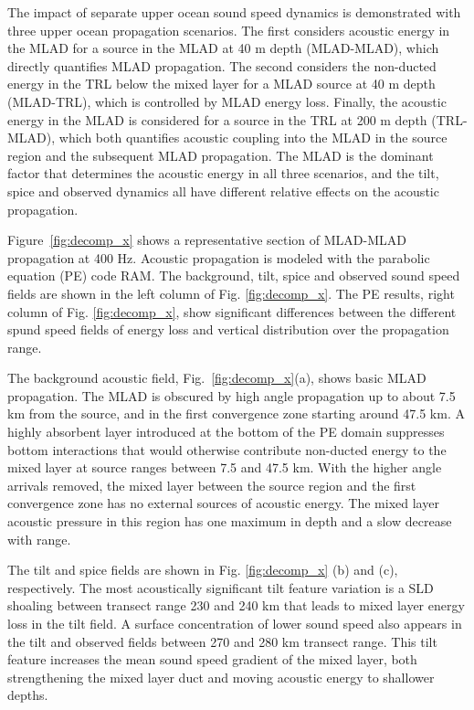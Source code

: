 \documentclass[preprint,NumberedRefs]{JASA}
\begin{document}
The impact of separate upper ocean sound speed dynamics is demonstrated with three upper ocean propagation scenarios. The first considers acoustic energy in the MLAD for a source in the MLAD at 40 m depth (MLAD-MLAD), which directly quantifies MLAD propagation. The second considers the non-ducted energy in the TRL below the mixed layer for a MLAD source at 40 m depth (MLAD-TRL), which is controlled by MLAD energy loss. Finally, the acoustic energy in the MLAD is considered for a source in the TRL at 200 m depth (TRL-MLAD), which both quantifies acoustic coupling into the MLAD in the source region and the subsequent MLAD propagation. The MLAD is the dominant factor that determines the acoustic energy in all three scenarios, and the tilt, spice and observed dynamics all have different relative effects on the acoustic propagation.

Figure~\ref{fig:decomp_x} shows a representative section of MLAD-MLAD propagation at 400 Hz. Acoustic propagation is modeled with the parabolic equation (PE) code RAM\citep{collins93}. The background, tilt, spice and observed sound speed fields are shown in the left column of Fig. \ref{fig:decomp_x}. The PE results, right column  of Fig. \ref{fig:decomp_x}, show significant differences between the different spund speed fields of energy loss and vertical distribution over the propagation range.

The background acoustic field, Fig.~\ref{fig:decomp_x}(a), shows basic MLAD propagation. The MLAD is obscured by high angle propagation up to about 7.5 km from the source, and in the first convergence zone starting around 47.5 km. A highly absorbent layer introduced at the bottom of the PE domain suppresses bottom interactions that would otherwise contribute non-ducted energy to the mixed layer at source ranges between 7.5 and 47.5 km. With the higher angle arrivals removed, the mixed layer between the source region and the first convergence zone has no external sources of acoustic energy. The mixed layer acoustic pressure in this region has one maximum in depth and a slow decrease with range.

The tilt and spice fields are shown in Fig. \ref{fig:decomp_x} (b) and (c), respectively. The most acoustically significant tilt feature variation is a SLD shoaling between transect range 230 and 240 km that leads to mixed layer energy loss in the tilt field. A surface concentration of lower sound speed also appears in the tilt and observed fields between 270 and 280 km transect range. This tilt feature increases the mean sound speed gradient of the mixed layer, both strengthening the mixed layer duct and moving acoustic energy to shallower depths.
\end{document}
